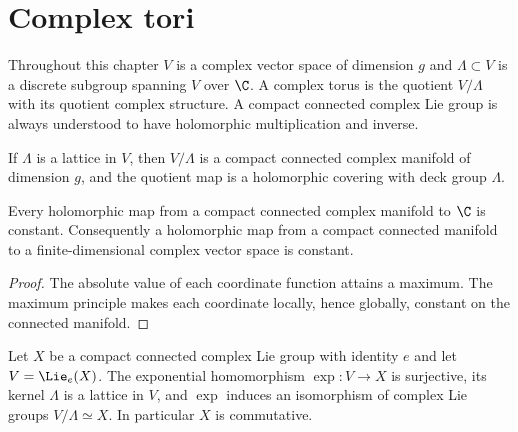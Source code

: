 \section{Complex tori}
\label{mumford-I1}

\begin{convention}
\label{mumford-conv-complex-analytic}
Throughout this chapter $V$ is a complex vector space of dimension $g$ and
$\Lambda\subset V$ is a discrete subgroup spanning $V$ over $\C$.  A complex
torus is the quotient $V/\Lambda$ with its quotient complex structure.  A
compact connected complex Lie group is always understood to have holomorphic
multiplication and inverse.
\notready
\end{convention}

\begin{lemma}
\label{mumford-lem-compact-lattice-quotient}
If $\Lambda$ is a lattice in $V$, then $V/\Lambda$ is a compact connected
complex manifold of dimension $g$, and the quotient map is a holomorphic
covering with deck group $\Lambda$.
\notready
\end{lemma}

\begin{lemma}
\label{mumford-lem-compact-holomorphic-functions}
Every holomorphic map from a compact connected complex manifold to $\C$ is
constant.  Consequently a holomorphic map from a compact connected manifold
to a finite-dimensional complex vector space is constant.
\begin{proof}
The absolute value of each coordinate function attains a maximum.  The maximum
principle makes each coordinate locally, hence globally, constant on the
connected manifold.
\end{proof}
\notready
\end{lemma}

\begin{theorem}
\label{mumford-thm-complex-lie-uniformization}
Let $X$ be a compact connected complex Lie group with identity $e$ and let
$V=\Lie_e(X)$.  The exponential homomorphism $\exp:V\to X$ is surjective,
its kernel $\Lambda$ is a lattice in $V$, and $\exp$ induces an isomorphism
of complex Lie groups $V/\Lambda\simeq X$.  In particular $X$ is commutative.
\notready
\end{theorem}

